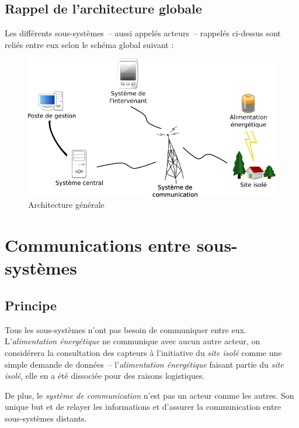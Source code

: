 \documentclass[a4paper, 11pt, final]{article}
\begin{document}
\subsection{Rappel de l'architecture globale}
Les différents sous-systèmes~-- aussi appelés acteurs~-- rappelés ci-dessus sont
reliés entre eux selon le schéma global suivant :
\begin{figure}[!h]
\begin{center}
\includegraphics[width=\textwidth]{schema_architecture_generale.png}
\caption{Architecture générale}
\end{center}
\end{figure}

\section{Communications entre sous-systèmes}

\subsection{Principe}
Tous les sous-systèmes n'ont pas besoin de communiquer entre eux.
L'\emph{alimentation énergétique} ne communique avec aucun autre acteur,
on considérera la consultation des capteurs à l'initiative du \emph{site
isolé} comme une simple demande de données~-- l'\emph{alimentation énergétique}
faisant partie du \emph{site isolé}, elle en a été dissociée pour des
raisons logistiques.

De plus, le \emph{système de communication} n'est pas un acteur comme
les autres. Son unique but et de relayer les informations et d'assurer
la communication entre sous-systèmes distants.
\end{document}
